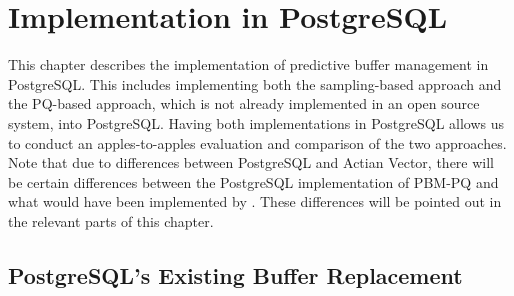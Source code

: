 
\chapter{\label{sec:pbm-pq_postgres}Implementation in P\MakeLowercase{ostgre}SQL}




This chapter describes the implementation of predictive buffer management in PostgreSQL. This includes implementing both the sampling-based approach and the PQ-based approach, which is not already implemented in an open source system, into PostgreSQL. Having both implementations in PostgreSQL allows us to conduct an apples-to-apples evaluation and  comparison of the two approaches. Note that due to differences between PostgreSQL and Actian Vector, there will be certain differences between the PostgreSQL implementation of PBM-PQ and what would have been implemented by \cite{pbm}. These differences will be pointed out in the relevant parts of this chapter.



\section{PostgreSQL's Existing Buffer Replacement}

